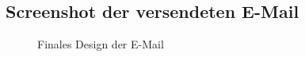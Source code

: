 \subsection{Screenshot der versendeten E-Mail}
\label{Screenshots}
\begin{figure}[htb]
    \centering
    \caption{Finales Design der E-Mail}
    \label{app:finalDesign}
    \end{figure}

